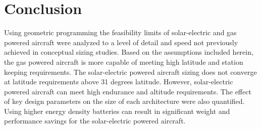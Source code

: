 
\chapter{Conclusion}
Using geometric programming the feasibility limits of solar-electric and gas powered aircraft were analyzed to a level of detail and speed not previously achieved in conceptual sizing studies. 
Based on the assumptions included herein, the gas powered aircraft is more capable of meeting high latitude and station keeping requirements. 
The solar-electric powered aircraft sizing does not converge at latitude requirements above 31 degrees latitude. 
However, solar-electric powered aircraft can meet high endurance and altitude requirements.  
The effect of key design parameters on the size of each architecture were also quantified.  
Using higher energy density batteries can result in significant weight and performance savings for the solar-electric powered aircraft.  
